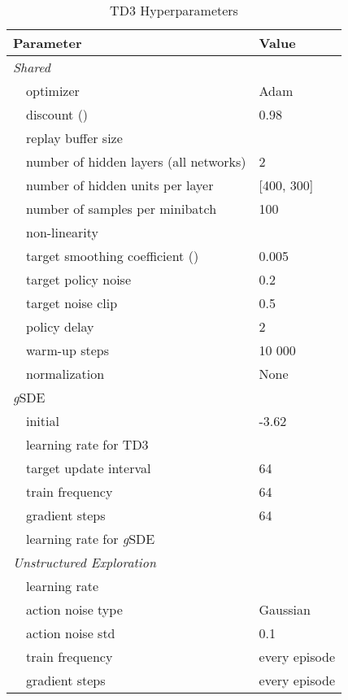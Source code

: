 \documentclass{article}
\newcommand{\ourSDE}{\textit{g}\textsc{SDE}\xspace}
\newcommand{\tddd}{\textsc{TD3}\xspace}
\begin{document}
\begin{table}[h]
\renewcommand{\arraystretch}{1.1}
\centering
\caption{\tddd Hyperparameters}
\label{tab:td3_shared_params}
\vspace{1mm}
  \begin{tabular}{@{}l l| l@{}}
    \toprule
    \multicolumn{2}{l|}{Parameter} &  Value\\
    \midrule
    \multicolumn{2}{l|}{\textit{Shared}}& \\
    & optimizer & Adam~\citep{kingma2014adam}\\
    & discount () &  0.98\\
    & replay buffer size & \\
    & number of hidden layers (all networks) & 2\\
    & number of hidden units per layer & [400, 300]\\
    & number of samples per minibatch & 100\\
    & non-linearity & \\
    & target smoothing coefficient ()& 0.005\\
    & target policy noise & 0.2 \\
    & target noise clip & 0.5 \\
    & policy delay & 2\\
    & warm-up steps & 10 000\\
    & normalization & None\\
    \midrule
    \multicolumn{2}{l|}{\ourSDE}& \\
    & initial  & -3.62\\
    & learning rate for \tddd & \\
    & target update interval & 64\\
    & train frequency & 64\\
    & gradient steps & 64\\
    & learning rate for \ourSDE & \\
    \midrule
    \multicolumn{2}{l|}{\textit{Unstructured Exploration}}& \\
    & learning rate & \\
    & action noise type & Gaussian\\
    & action noise std & 0.1 \\
    & train frequency & every episode\\
    & gradient steps & every episode\\
    \bottomrule
  \end{tabular}
\end{table}
\end{document}

